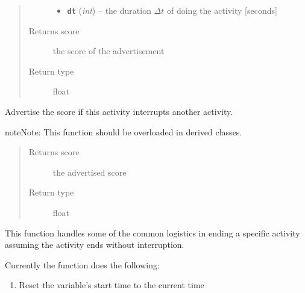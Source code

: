 \documentclass[letterpaper,10pt,english]{sphinxmanual}
\begin{document}
\begin{fulllineitems}
\begin{fulllineitems}
\begin{quote}
\begin{description}
\begin{itemize}
\item {} 
\textbf{\texttt{dt}} (\emph{int}) -- the duration \(\Delta{t}\) of doing the activity {[}seconds{]}

\end{itemize}

\item[{Returns score}] \leavevmode
the score of the advertisement

\item[{Return type}] \leavevmode
float

\end{description}\end{quote}

\end{fulllineitems}


\begin{fulllineitems}
\label{activity:activity.Activity.advertise_interruption}
Advertise the score if this activity interrupts another activity.

\begin{notice}{note}{Note:}
This function should be overloaded in derived classes.
\end{notice}
\begin{quote}\begin{description}
\item[{Returns score}] \leavevmode
the advertised score

\item[{Return type}] \leavevmode
float

\end{description}\end{quote}

\end{fulllineitems}


\begin{fulllineitems}
\label{activity:activity.Activity.end}
This function handles some of the common logistics in ending a specific activity assuming         the activity ends without interruption.

Currently the function does the following:
\begin{enumerate}
\item {} 
Reset the {\hyperref[state:state.State]{\emph{}}} variable's start time to the current time


\end{enumerate}
\end{fulllineitems}
\end{fulllineitems}
\end{document}
